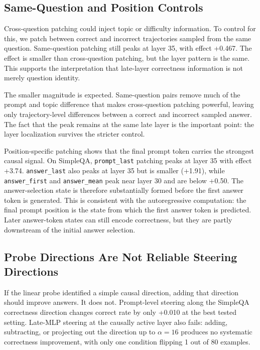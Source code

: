 \documentclass[11pt]{article}
\begin{document}
\subsection{Same-Question and Position Controls}

Cross-question patching could inject topic or difficulty information. To control
for this, we patch between correct and incorrect trajectories sampled from the
same question. Same-question patching still peaks at layer 35, with effect +0.467.
The effect is smaller than cross-question patching, but the layer pattern is the
same. This supports the interpretation that late-layer correctness information is
not merely question identity.

The smaller magnitude is expected. Same-question pairs remove much of the prompt
and topic difference that makes cross-question patching powerful, leaving only
trajectory-level differences between a correct and incorrect sampled answer. The
fact that the peak remains at the same late layer is the important point: the
layer localization survives the stricter control.

Position-specific patching shows that the final prompt token carries the strongest
causal signal. On SimpleQA, \texttt{prompt\_last} patching peaks at layer 35 with
effect +3.74. \texttt{answer\_last} also peaks at layer 35 but is smaller (+1.91),
while \texttt{answer\_first} and \texttt{answer\_mean} peak near layer 30 and are
below +0.50. The answer-selection state is therefore substantially formed before
the first answer token is generated.
This is consistent with the autoregressive computation: the final prompt position
is the state from which the first answer token is predicted. Later answer-token
states can still encode correctness, but they are partly downstream of the initial
answer selection.

\subsection{Probe Directions Are Not Reliable Steering Directions}

If the linear probe identified a simple causal direction, adding that direction
should improve answers. It does not. Prompt-level steering along the SimpleQA
correctness direction changes correct rate by only +0.010 at the best tested
setting. Late-MLP steering at the causally active layer also fails: adding,
subtracting, or projecting out the direction up to $\alpha=16$ produces no
systematic correctness improvement, with only one condition flipping 1 out of 80
examples.
\end{document}
